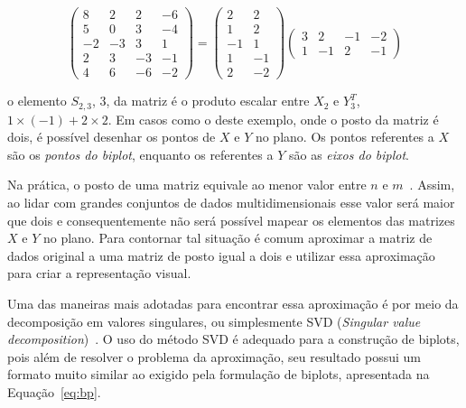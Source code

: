 \begin{equation}
    \left( \begin{array}{rrrr}
        8 &  2 &  2 & -6 \\
        5 &  0 &  3 & -4 \\
       -2 & -3 &  3 &  1 \\
            2 &  3 & -3 & -1 \\
        4 &  6 & -6 & -2\end{array}
\right) = \left( \begin{array}{rr}
         2 & 2 \\
         1 & 2 \\
        -1 & 1 \\
         1 & -1 \\
         2 & -2\end{array} 
\right) \left( \begin{array}{rrrr}
        3 &  2 &-1 & -2 \\
    1 & -1 & 2 & -1 \end{array} 
\right)
\end{equation}

o elemento $S_{2,3}$, 3, da matriz é o
produto escalar entre $X_2$ e $Y^T_3$, $1 \times \left( -1
\right) + 2 \times 2$. Em casos como o deste
exemplo, onde o posto da matriz é dois, é possível desenhar os
pontos de $X$ e $Y$ no plano. Os pontos referentes a $X$ são
os \emph{pontos do biplot}, enquanto os referentes a $Y$ são
as \emph{eixos do biplot}.

Na prática, o posto de uma matriz equivale ao menor valor
entre $n$ e $m$~\cite{Greenacre2010}. Assim, ao lidar com
grandes conjuntos de dados multidimensionais esse valor será
maior que dois e consequentemente não será possível mapear
os elementos das matrizes $X$ e $Y$ no plano. Para contornar
tal situação é comum aproximar a matriz de dados original a
uma matriz de posto igual a dois e utilizar essa aproximação
para criar a representação visual.

Uma das maneiras mais adotadas para encontrar essa
aproximação é por meio da decomposição em valores
singulares, ou simplesmente SVD (\emph{Singular value
decomposition})~\cite{Kalman1996}. O uso do método SVD é
adequado para a construção de biplots, pois além de
resolver o problema da aproximação, seu resultado possui
um formato muito similar ao exigido pela formulação de biplots,
apresentada na Equação~\ref{eq:bp}.

